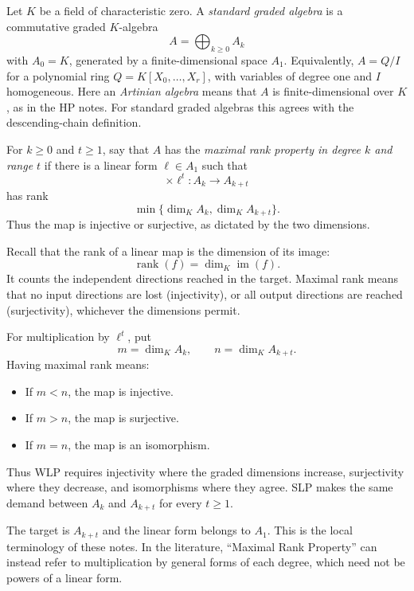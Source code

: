 \begin{definition}
\label{definition-standard-graded}
Let $K$ be a field of characteristic zero.
A \emph{standard graded algebra} is a
commutative graded $K$-algebra
$$
A=\bigoplus_{k\geq0}A_k
$$
with $A_0=K$, generated by a
finite-dimensional space $A_1$.
Equivalently, $A=Q/I$ for a polynomial ring
$Q=K[X_0,\ldots,X_r]$, with variables of
degree one and $I$ homogeneous.
Here an \emph{Artinian algebra} means that
$A$ is finite-dimensional over $K$, as in
the HP notes.
For standard graded algebras this agrees
with the descending-chain definition.
\end{definition}

\begin{definition}
\label{definition-maximal-rank}
For $k\geq0$ and $t\geq1$, say that $A$
has the \emph{maximal rank property in
degree $k$ and range $t$} if there is a
linear form $\ell\in A_1$ such that
$$
\times\ell^t:A_k\longrightarrow A_{k+t}
$$
has rank
$$
\min\{\dim_K A_k,\dim_K A_{k+t}\}.
$$
Thus the map is injective or surjective,
as dictated by the two dimensions.
\end{definition}

\begin{remark}
\label{remark-understanding-rank}
Recall that the rank of a linear map
is the dimension of its image:
$$
\operatorname{rank}(f)
=\dim_K\operatorname{im}(f).
$$
It counts the independent directions
reached in the target. Maximal rank
means that no input directions are lost
(injectivity), or all output directions
are reached (surjectivity), whichever
the dimensions permit.

For multiplication by $\ell^t$, put
$$
m=\dim_K A_k,\qquad n=\dim_K A_{k+t}.
$$
Having maximal rank means:
\begin{itemize}
\item If $m<n$, the map is injective.
\item If $m>n$, the map is surjective.
\item If $m=n$, the map is an isomorphism.
\end{itemize}
Thus WLP requires injectivity where
the graded dimensions increase,
surjectivity where they decrease,
and isomorphisms where they agree.
SLP makes the same demand between
$A_k$ and $A_{k+t}$ for every $t\geq1$.
\end{remark}

\begin{remark}
\label{remark-maximal-rank-terminology}
The target is $A_{k+t}$ and the linear
form belongs to $A_1$.
This is the local terminology of these
notes. In the literature, ``Maximal Rank
Property'' can instead refer to
multiplication by general forms of each
degree, which need not be powers of a
linear form.
\end{remark}

